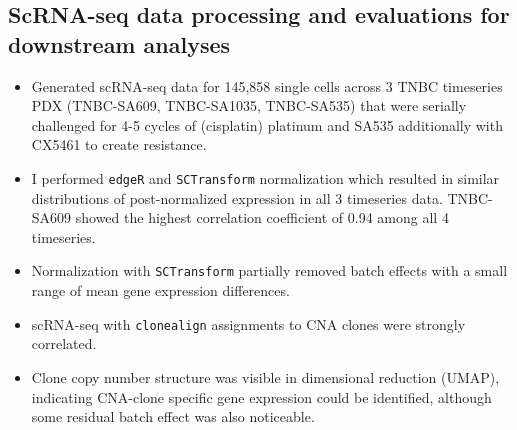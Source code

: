   
  \subsection{ScRNA-seq data processing and evaluations for downstream analyses} 
\begin{itemize}
  
   \item Generated scRNA-seq data for 145,858 single cells across 3 TNBC timeseries PDX 
(TNBC-SA609, TNBC-SA1035, TNBC-SA535) that were serially challenged for 4-5 cycles of (cisplatin) platinum and SA535 additionally with CX5461 to create resistance.
   \item I performed  \texttt{edgeR} and \texttt{SCTransform}  normalization which resulted in similar distributions of post-normalized expression in all 3 timeseries data. TNBC-SA609 showed the highest correlation coefficient of 0.94 among all 4 timeseries.
 
 \item Normalization with \texttt{SCTransform} partially removed batch effects with a small range of mean gene expression differences.

 \item scRNA-seq with \texttt{clonealign} assignments to CNA clones were strongly correlated.
 
 \item Clone copy number structure was visible in dimensional reduction (UMAP), indicating CNA-clone specific gene expression could be identified, although some residual batch effect was also noticeable.

\end{itemize}
